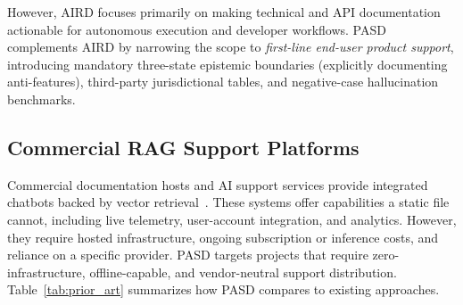 \documentclass[12pt, a4paper]{article}
\begin{document}
However, AIRD focuses primarily on making technical and API documentation actionable for autonomous execution and developer workflows. PASD complements AIRD by narrowing the scope to \textit{first-line end-user product support}, introducing mandatory three-state epistemic boundaries (explicitly documenting anti-features), third-party jurisdictional tables, and negative-case hallucination benchmarks.

\subsection{Commercial RAG Support Platforms}
Commercial documentation hosts and AI support services provide integrated chatbots backed by vector retrieval~\citep{lewis2020rag, gao2023retrieval}. These systems offer capabilities a static file cannot, including live telemetry, user-account integration, and analytics. However, they require hosted infrastructure, ongoing subscription or inference costs, and reliance on a specific provider. PASD targets projects that require zero-infrastructure, offline-capable, and vendor-neutral support distribution. Table~\ref{tab:prior_art} summarizes how PASD compares to existing approaches.
\end{document}
